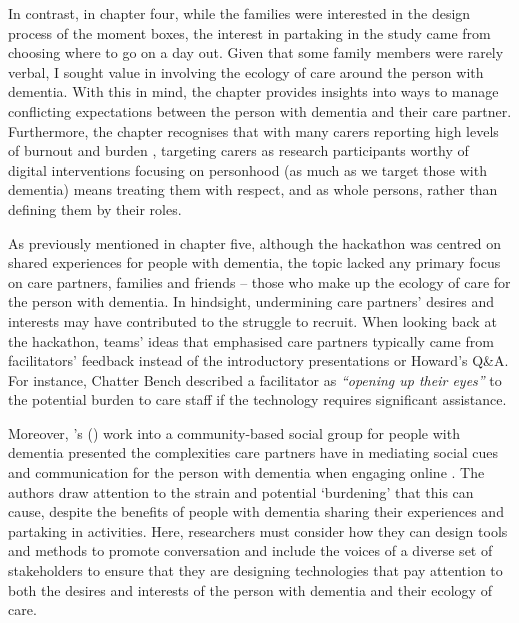 In contrast, in chapter four, while the families were interested in the design process of the moment boxes, the interest in partaking in the study came from choosing where to go on a day out. Given that some family members were rarely verbal, I sought value in involving the ecology of care around the person with dementia. With this in mind, the chapter provides insights into ways to manage conflicting expectations between the person with dementia and their care partner. Furthermore, the chapter recognises that with many carers reporting high levels of burnout and burden \citep{lee_technology-based_2015},  targeting carers as research participants worthy of digital interventions focusing on personhood (as much as we target those with dementia) means treating them with respect, and as whole persons, rather than defining them by their roles. 

As previously mentioned in chapter five, although the hackathon was centred on shared experiences for people with dementia, the topic lacked any primary focus on care partners, families and friends – those who make up the ecology of care for the person with dementia. In hindsight, undermining care partners' desires and interests may have contributed to the struggle to recruit. When looking back at the hackathon, teams' ideas that emphasised care partners typically came from facilitators' feedback instead of the introductory presentations or Howard's Q\&A. For instance, Chatter Bench described a facilitator as \textit{``opening up their eyes''} to the potential burden to care staff if the technology requires significant assistance. 

Moreover, \citeauthor{dai2020making}'s (\citeyear{dai2020making}) work into a community-based social group for people with dementia presented the complexities care partners have in mediating social cues and communication for the person with dementia when engaging online \citep{dai2020making}. The authors draw attention to the strain and potential `burdening' that this can cause, despite the benefits of people with dementia sharing their experiences and partaking in activities. Here, researchers must consider how they can design tools and methods to promote conversation and include the voices of a diverse set of stakeholders to ensure that they are designing technologies that pay attention to both the desires and interests of the person with dementia and their ecology of care.

